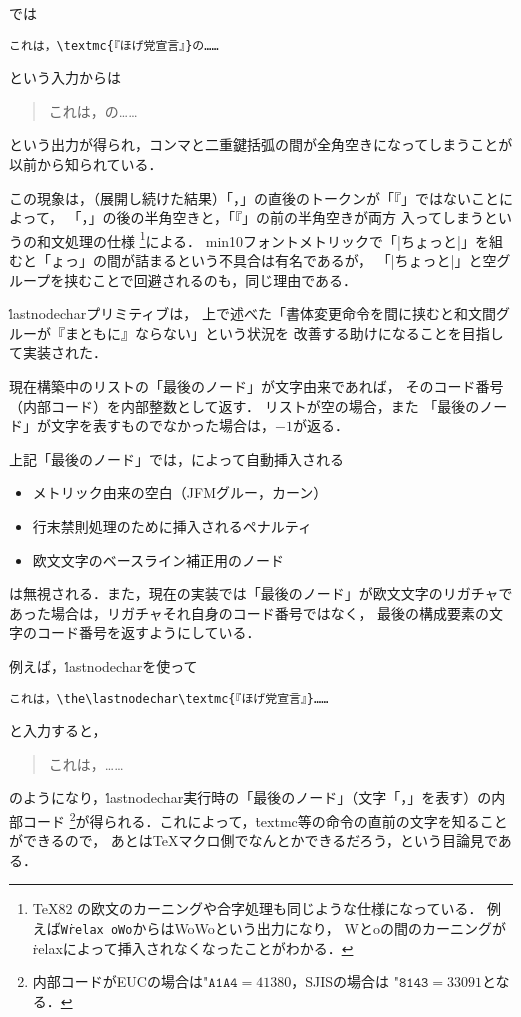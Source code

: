 \documentclass[a4paper,11pt,nomag,dvipdfmx]{jsarticle}
\begin{document}
\pTeX では
\begin{verbatim}
これは，\textmc{『ほげ党宣言』}の……
\end{verbatim}
という入力からは
\begin{quote}
これは，の……
\end{quote}
という出力が得られ，コンマと二重鍵括弧の間が全角空きになってしまうことが以前から知られている．

この現象は，（展開し続けた結果）「，」の直後のトークンが「『」ではないことによって，
「，」の後の半角空きと，「『」の前の半角空きが両方
入ってしまうという\pTeX の和文処理の仕様
\footnote{%
  \TeX82 の欧文のカーニングや合字処理も同じような仕様になっている．
  例えば\texttt{W\.{relax}\ oWo}からはW\relax oWoという出力になり，
  Wとoの間のカーニングが\.{relax}によって挿入されなくなったことがわかる．
}による．
min10フォントメトリックで「|ちょっと|」を組むと「ょっ」の間が詰まるという不具合は有名であるが，
「|ちょ{}っと|」と空グループを挟むことで回避されるのも，同じ理由である．

\medskip

\.{lastnodechar}プリミティブは，
上で述べた「書体変更命令を間に挟むと和文間グルーが『まともに』ならない」という状況を
改善する助けになることを目指して実装された．

\begin{cslist}
  現在構築中のリストの「最後のノード」が文字由来であれば，
  そのコード番号（内部コード）を内部整数として返す．
  リストが空の場合，また
  「最後のノード」が文字を表すものでなかった場合は，$-1$が返る．

  上記「最後のノード」では，\pTeX によって自動挿入される
  \begin{itemize}
    \item メトリック由来の空白（JFMグルー，カーン）
    \item 行末禁則処理のために挿入されるペナルティ
    \item 欧文文字のベースライン補正用のノード
  \end{itemize}
  は無視される．また，現在の実装では「最後のノード」が欧文文字のリガチャで
  あった場合は，リガチャそれ自身のコード番号ではなく，
  最後の構成要素の文字のコード番号を返すようにしている．
\end{cslist}

例えば，\.{lastnodechar}を使って
\begin{verbatim}
これは，\the\lastnodechar\textmc{『ほげ党宣言』}……
\end{verbatim}
と入力すると，
\begin{quote}
これは，\the\lastnodechar{}……
\end{quote}
のようになり，\.{lastnodechar}実行時の「最後のノード」（文字「，」を表す）の内部コード
\footnote{%
  内部コードがEUCの場合は$\texttt{"A1A4} = 41380$，SJISの場合は
  $\texttt{"8143} = 33091$となる．
}が得られる．これによって，\.{textmc}等の命令の直前の文字を知ることができるので，
あとは\TeX マクロ側でなんとかできるだろう，という目論見である．
\end{document}
